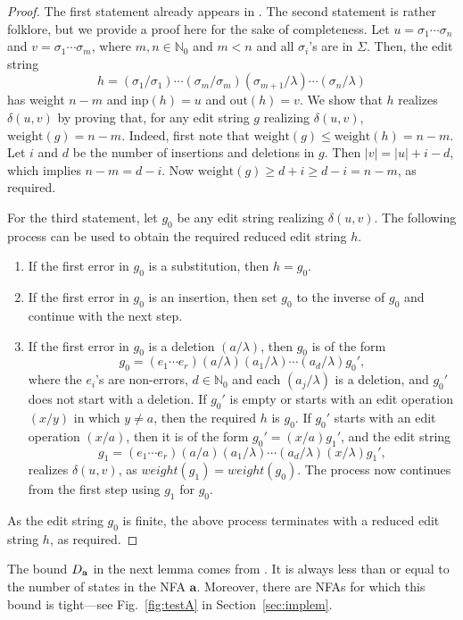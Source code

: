 \documentclass{article}
\theoremstyle{plain}
\theoremstyle{definition}
\theoremstyle{remark}
\newcommand{\N}{\mathbb{N}}
\newcommand{\e}{\lambda}
\newcommand\dsid{\ensuremath{\delta}\xspace}
\newcommand\al{\Sigma}        \newcommand\alG{\Gamma}        \newcommand\eew{(\e/\e)}        \newcommand\ealph{E_\al}   \newcommand\aut{\mathbf{a}}   \newcommand\autb{\mathbf{b}}   \newcommand\tr{\mathbf{t}}    \newcommand\sz[1]{|#1|}       \newcommand\weight[1]{\mathrm{weight}(#1)}       \newcommand\ch{\gamma}        \newcommand\chid{\mathrm{id}} \newcommand\chsid{\mathrm{sid}} \newcommand\dist{\dsid}               \newcommand\inp{\mathrm{inp}}
\newcommand\out{\mathrm{out}}
\begin{document}
\begin{proof}
The first statement already appears in \cite{Levenshtein:66:en}. The second statement
is rather folklore, but we provide a proof here for the sake of completeness.
Let $u=\sigma_1\cdots\sigma_n$ and $v=\sigma_1\cdots\sigma_m$, where $m,n\in\N_0$ and $m<n$ and all $\sigma_i$'s are in $\al$. Then, the edit
string
\[
h=(\sigma_1/\sigma_1)\cdots(\sigma_m/\sigma_m)
(\sigma_{m+1}/\e)\cdots(\sigma_n/\e)
\]
has weight $n-m$ and $\inp(h)=u$ and $\out(h)=v$.
We show that $h$ realizes $\dsid(u,v)$ by proving that,
for any edit string $g$ realizing $\dsid(u,v)$,
$\weight{g}=n-m$. Indeed, first note that
$\weight{g}\le \weight{h}=n-m$. Let $i$ and $d$ be the number
of insertions and deletions in $g$. Then $|v|=|u|+i-d$,
which implies $n-m=d-i$. Now $\weight{g}\ge d+i\ge
d-i= n-m$, as required.
\par
For the third statement, let $g_0$ be any edit string
realizing $\dsid(u,v)$. The following process can be used
to obtain the required reduced edit string $h$.
\begin{enumerate}
  \item If the first error in $g_0$ is a substitution, then $h=g_0$.
  \item If the first error in $g_0$ is an insertion, then  set $g_0$ to the inverse of $g_0$ and continue with
      the next step.
  \item If the first error in $g_0$ is a deletion $(a/\e)$, then $g_0$ is of the form
      \[
      g_0=(e_1\cdots e_r)(a/\e)(a_1/\e)\cdots(a_d/\e)g_0',
      \]
      where the $e_i$'s are non-errors, $d\in\N_0$ and each
      $(a_j/\e)$ is a deletion, and $g_0'$
      does not start with a deletion. If $g_0'$ is empty or starts with an edit operation $(x/y)$ in which $y\not=a$, then the required $h$ is $g_0$. If $g_0'$
      starts with an edit operation $(x/a)$, then it is of the form $g_0'=(x/a)g_1'$, and the
      edit string
      \[
      g_1=(e_1\cdots e_r)(a/a)(a_1/\e)\cdots(a_d/\e)(x/\e)g_1',
      \]
      realizes $\dsid(u,v)$, as  $weight(g_1) = weight(g_0)$. The process now continues from the first step using $g_1$ for $g_0$.
\end{enumerate}
As the edit string $g_0$ is finite, the above process
terminates with a reduced edit string $h$, as required.
\end{proof}

The bound $\dbold_\aut$ in the next lemma comes from
\cite{Kon:2007}. It is always less than or equal to
the number of states in the NFA $\aut$. Moreover, there are NFAs for which this bound is tight---see Fig.~\ref{fig:testA}
in Section~\ref{sec:implem}.
\end{document}
